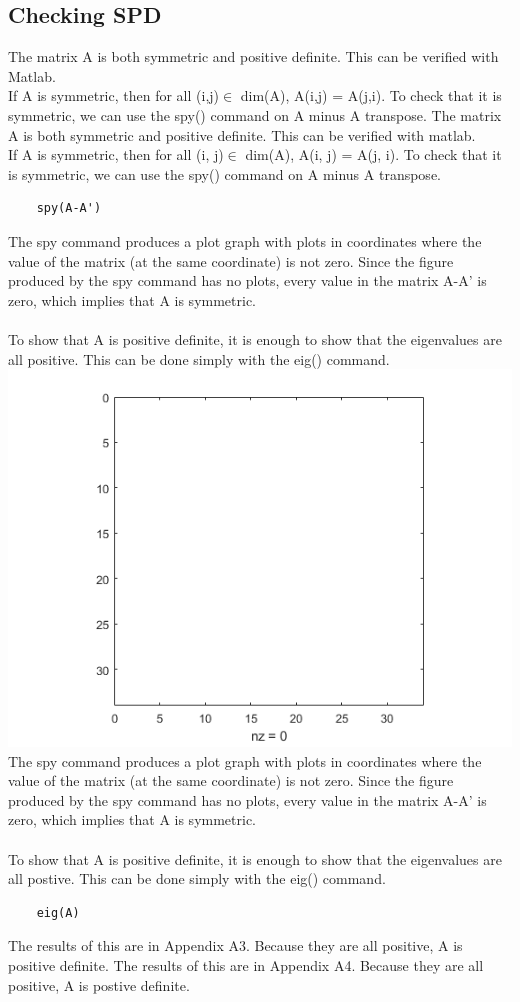 \documentclass[12pt,a4paper]{article}
\begin{document}
\subsection{Checking SPD}
The matrix A is both symmetric and positive definite. This can be verified with Matlab.\\If A is symmetric, then for all (i,j)$\in$ dim(A), A(i,j) = A(j,i). To check that it is symmetric, we can use the spy() command on A minus A transpose.
The matrix A is both symmetric and positive definite. This can be verified with matlab.\\If A is symmetric, then for all (i, j)$\in$ dim(A), A(i, j) = A(j, i). To check that it is symmetric, we can use the spy() command on A minus A transpose.
\begin{verbatim}
	spy(A-A')
\end{verbatim}
The spy command produces a plot graph with plots in coordinates where the value of the matrix (at the same coordinate) is not zero. Since the figure produced by the spy command has no plots, every value in the matrix A-A' is zero, which implies that A is symmetric.\\\\To show that A is positive definite, it is enough to show that the eigenvalues are all positive. This can be done simply with the eig() command.
\includegraphics{images/spySymmetric.png}
The spy command produces a plot graph with plots in coordinates where the value of the matrix (at the same coordinate) is not zero. Since the figure produced by the spy command has no plots, every value in the matrix A-A' is zero, which implies that A is symmetric.\\\\To show that A is positive definite, it is enough to show that the eigenvalues are all postive. This can be done simply with the eig() command.
\begin{verbatim}
	eig(A)
\end{verbatim}
The results of this are in Appendix A3. Because they are all positive, A is positive definite. 
The results of this are in Appendix A4. Because they are all positive, A is postive definite. 
\end{document}
